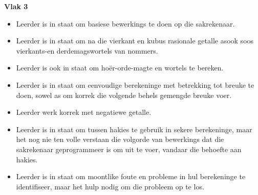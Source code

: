 \textbf{Vlak 3}\begin{itemize}[noitemsep]
\item
Leerder is in staat om basiese bewerkings te doen op die sakrekenaar.
\item
Leerder is in staat om na die vierkant en kubus rasionale getalle
asook soos vierkants-en derdemagswortels van nommers.
\item
Leerder is ook in staat om hoër-orde-magte en wortels te bereken.
\item
Leerder is in staat om eenvoudige berekeninge met betrekking tot
breuke te doen, sowel as om korrek die volgende behels gemengde breuke
voer.
\item
Leerder werk korrek met negatiewe getalle.
\item
Leerder is in staat om tussen hakies te gebruik in sekere berekeninge,
maar het nog nie ten volle verstaan ​​die volgorde van bewerkings dat
die sakrekenaar geprogrammeer is om uit te voer, vandaar die behoefte
aan hakies.
\item
Leerder is in staat om moontlike foute en probleme in hul berekeninge
te identifiseer, maar het hulp nodig om die probleem op te los.
\end{itemize}
